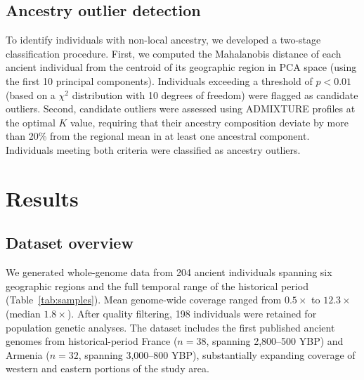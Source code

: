 \documentclass[11pt,a4paper]{article}
\begin{document}
\subsection{Ancestry outlier detection}
To identify individuals with non-local ancestry, we developed a two-stage classification procedure. First, we computed the Mahalanobis distance of each ancient individual from the centroid of its geographic region in PCA space (using the first 10 principal components). Individuals exceeding a threshold of $p < 0.01$ (based on a $\chi^2$ distribution with 10 degrees of freedom) were flagged as candidate outliers. Second, candidate outliers were assessed using ADMIXTURE profiles at the optimal $K$ value, requiring that their ancestry composition deviate by more than 20\% from the regional mean in at least one ancestral component. Individuals meeting both criteria were classified as ancestry outliers.

\section{Results}

\subsection{Dataset overview}
We generated whole-genome data from 204 ancient individuals spanning six geographic regions and the full temporal range of the historical period (Table~\ref{tab:samples}). Mean genome-wide coverage ranged from $0.5\times$ to $12.3\times$ (median $1.8\times$). After quality filtering, 198 individuals were retained for population genetic analyses. The dataset includes the first published ancient genomes from historical-period France ($n = 38$, spanning 2,800--500 YBP) and Armenia ($n = 32$, spanning 3,000--800 YBP), substantially expanding coverage of western and eastern portions of the study area.
\end{document}
